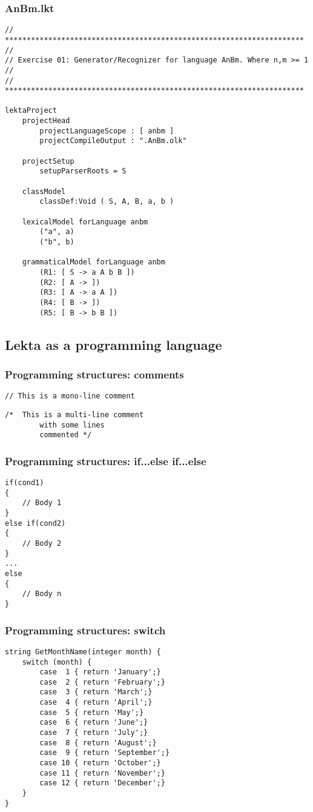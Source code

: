 \documentclass[11pt]{beamer}
\begin{document}
\begin{frame}[fragile]
\frametitle{AnBm.lkt}
\tiny
\begin{lstlisting}[language=lekta]
// *********************************************************************
//
// Exercise 01: Generator/Recognizer for language AnBm. Where n,m >= 1
//
// *********************************************************************

lektaProject
	projectHead
		projectLanguageScope : [ anbm ]
		projectCompileOutput : ".AnBm.olk"

	projectSetup
		setupParserRoots = S

	classModel
		classDef:Void ( S, A, B, a, b )

	lexicalModel forLanguage anbm
		("a", a)
		("b", b)

	grammaticalModel forLanguage anbm
		(R1: [ S -> a A b B ])
		(R2: [ A -> ])
		(R3: [ A -> a A ])
		(R4: [ B -> ])
		(R5: [ B -> b B ])
\end{lstlisting}
\end{frame}

\subsection{Lekta as a programming language}

\begin{frame}[fragile]
\frametitle{Programming structures: comments}
\begin{lstlisting}[language=lekta]
// This is a mono-line comment
\end{lstlisting}

\begin{lstlisting}[language=lekta]
/*	This is a multi-line comment
		with some lines	
		commented */
\end{lstlisting}
\end{frame}

\begin{frame}[fragile]
\frametitle{Programming structures: if...else if...else}
\begin{lstlisting}[language=lekta]
if(cond1)
{
	// Body 1
}
else if(cond2)
{
	// Body 2
}
...
else
{
	// Body n
}
\end{lstlisting}
\end{frame}

\begin{frame}[fragile]
\frametitle{Programming structures: switch}
\begin{lstlisting}[language=lekta]
string GetMonthName(integer month) {
	switch (month) {
		case  1 { return 'January';}
		case  2 { return 'February';}
		case  3 { return 'March';}
		case  4 { return 'April';}
		case  5 { return 'May';}
		case  6 { return 'June';}
		case  7 { return 'July';}
		case  8 { return 'August';}
		case  9 { return 'September';}
		case 10 { return 'October';}
		case 11 { return 'November';}
		case 12 { return 'December';}
	}
}
\end{lstlisting}
\end{frame}
\end{document}
